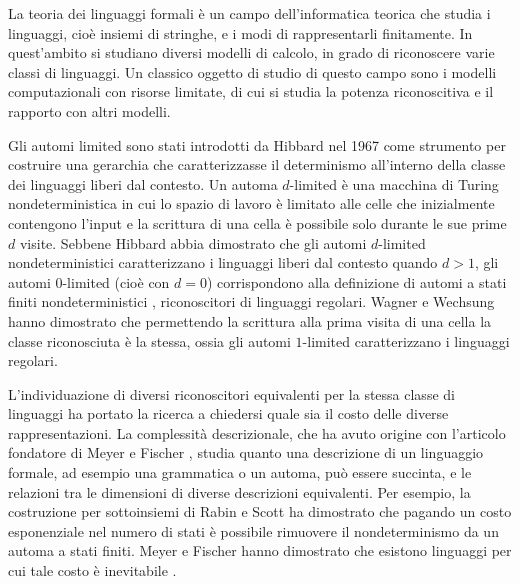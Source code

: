 \preface
La teoria dei linguaggi formali è un campo dell'informatica teorica che studia i linguaggi, cioè insiemi di stringhe, e i modi di rappresentarli finitamente. In quest'ambito si studiano diversi modelli di calcolo, in grado di riconoscere varie classi di linguaggi. Un classico oggetto di studio di questo campo sono i modelli computazionali con risorse limitate, di cui si studia la potenza riconoscitiva e il rapporto con altri modelli.

Gli automi limited sono stati introdotti da Hibbard nel 1967 \cite{Hibbard:67:CFdet} come strumento per costruire una gerarchia che caratterizzasse il determinismo all'interno della classe dei linguaggi liberi dal contesto.
Un automa $d$-limited è una macchina di Turing nondeterministica in cui lo spazio di lavoro è limitato alle celle che inizialmente contengono l'input e la scrittura di una cella è possibile solo durante le sue prime $d$ visite. Sebbene Hibbard abbia dimostrato che gli automi $d$-limited nondeterministici caratterizzano i linguaggi liberi dal contesto quando $d>1$, gli automi $0$-limited (cioè con $d=0$) corrispondono alla definizione di automi a stati finiti nondeterministici , riconoscitori di linguaggi regolari. Wagner e Wechsung \cite{Wagner:86:compCompl} hanno dimostrato che permettendo la scrittura alla prima visita di una cella la classe riconosciuta è la stessa, ossia gli automi $1$-limited caratterizzano i linguaggi regolari.

L'individuazione di diversi riconoscitori equivalenti per la stessa classe di linguaggi ha portato la ricerca a chiedersi quale sia il costo delle diverse rappresentazioni. La complessità descrizionale, che ha avuto origine con l'articolo fondatore di Meyer e Fischer \cite{Meyer:71:ecodescription}, studia quanto una descrizione di un linguaggio formale, ad esempio una grammatica o un automa, può essere succinta, e le relazioni tra le dimensioni di diverse descrizioni equivalenti. Per esempio, la costruzione per sottoinsiemi di Rabin e Scott \cite{Rabin:59:NFA} ha dimostrato che pagando un costo esponenziale nel numero di stati è possibile rimuovere il nondeterminismo da un automa a stati finiti. Meyer e Fischer hanno dimostrato che esistono linguaggi per cui tale costo è inevitabile \cite{Meyer:71:ecodescription}.

